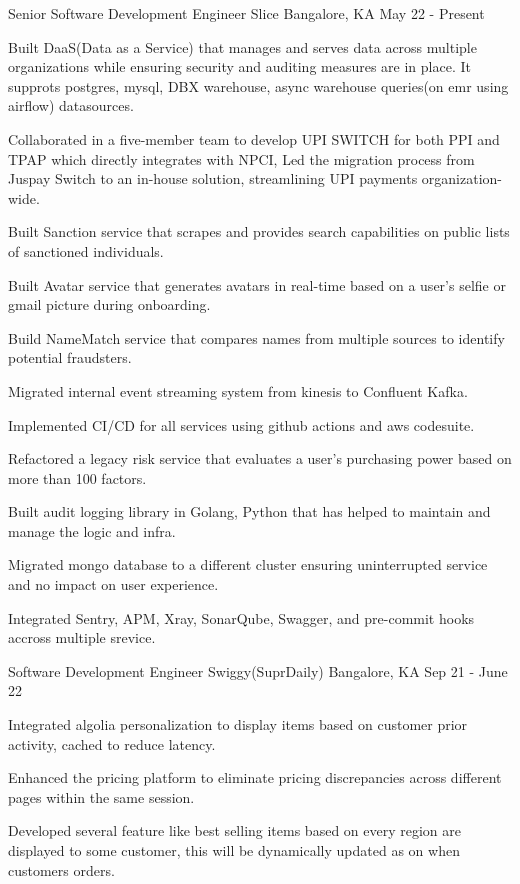 \begin{cventries}
  \cventry
    {Senior Software Development Engineer}
    {Slice}
    {Bangalore, KA}
    {May 22 - Present}
    {
      \begin{cvitems}
        \item {Built DaaS(Data as a Service) that manages and serves data across multiple organizations while ensuring security and auditing measures are in place. It supprots postgres, mysql, DBX warehouse, async warehouse queries(on emr using airflow) datasources.}
        \item {Collaborated in a five-member team to develop UPI SWITCH for both PPI and TPAP which directly integrates with NPCI, Led the migration process from Juspay Switch to an in-house solution, streamlining UPI payments organization-wide.}
        \item {Built Sanction service that scrapes and provides search capabilities on public lists of sanctioned individuals.}
        \item {Built Avatar service that generates avatars in real-time based on a user's selfie or gmail picture during onboarding.}
        \item {Build NameMatch service that compares names from multiple sources to identify potential fraudsters.}
        \item {Migrated internal event streaming system from kinesis to Confluent Kafka.}
        \item {Implemented CI/CD for all services using github actions and aws codesuite.}
        \item {Refactored a legacy risk service that evaluates a user's purchasing power based on more than 100 factors.}
        \item {Built audit logging library in Golang, Python that has helped to maintain and manage the logic and infra.}
        \item {Migrated mongo database to a different cluster ensuring uninterrupted service and no impact on user experience.}
        \item {Integrated Sentry, APM, Xray, SonarQube, Swagger, and pre-commit hooks accross multiple srevice.}
      \end{cvitems}
    }
  
  \cventry
    {Software Development Engineer}
    {Swiggy(SuprDaily)}
    {Bangalore, KA}
    {Sep 21 - June 22}
    {
      \begin{cvitems}
        \item {Integrated algolia personalization to display items based on customer prior activity, cached to reduce latency.}
        \item {Enhanced the pricing platform to eliminate pricing discrepancies across different pages within the same session.}
        \item {Developed several feature like best selling items based on every region are displayed to some customer, this will be dynamically updated as on when customers orders.}
      \end{cvitems}
    }
  

\end{cventries}
